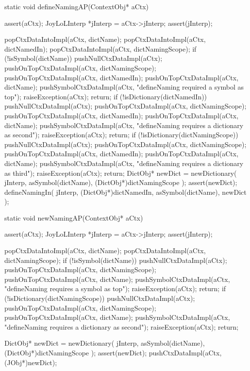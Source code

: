 \startCCode
static void defineNamingAP(ContextObj* aCtx) {
  assert(aCtx);
  JoyLoLInterp *jInterp = aCtx->jInterp;
  assert(jInterp);
  
  popCtxDataIntoImpl(aCtx, dictName);
  popCtxDataIntoImpl(aCtx, dictNamedIn);
  popCtxDataIntoImpl(aCtx, dictNamingScope);
  if (!isSymbol(dictName)) {
    pushNullCtxDataImpl(aCtx);
    pushOnTopCtxDataImpl(aCtx, dictNamingScope);
    pushOnTopCtxDataImpl(aCtx, dictNamedIn);
    pushOnTopCtxDataImpl(aCtx, dictName);
    pushSymbolCtxDataImpl(aCtx,
      "defineNaming required a symbol as top");
    raiseException(aCtx);
    return;
  }
  if (!isDictionary(dictNamedIn)) {
    pushNullCtxDataImpl(aCtx);
    pushOnTopCtxDataImpl(aCtx, dictNamingScope);
    pushOnTopCtxDataImpl(aCtx, dictNamedIn);
    pushOnTopCtxDataImpl(aCtx, dictName);
    pushSymbolCtxDataImpl(aCtx,
      "defineNaming requires a dictionary as second");
    raiseException(aCtx);
    return;
  }
  if (!isDictionary(dictNamingScope)) {
    pushNullCtxDataImpl(aCtx);
    pushOnTopCtxDataImpl(aCtx, dictNamingScope);
    pushOnTopCtxDataImpl(aCtx, dictNamedIn);
    pushOnTopCtxDataImpl(aCtx, dictName);
    pushSymbolCtxDataImpl(aCtx,
      "defineNaming requires a dictionary as third");
    raiseException(aCtx);
    return;
  }
  DictObj* newDict =
    newDictionary(
      jInterp,
      asSymbol(dictName),
      (DictObj*)dictNamingScope
    );
  assert(newDict);
  defineNamingIn(
    jInterp,
    (DictObj*)dictNamedIn,
    asSymbol(dictName),
    newDict
  );
}
\stopCCode

\startCCode
static void newNamingAP(ContextObj* aCtx) {
  assert(aCtx);
  JoyLoLInterp *jInterp = aCtx->jInterp;
  assert(jInterp);

  popCtxDataIntoImpl(aCtx, dictName);
  popCtxDataIntoImpl(aCtx, dictNamingScope);
  if (!isSymbol(dictName)) {
    pushNullCtxDataImpl(aCtx);
    pushOnTopCtxDataImpl(aCtx, dictNamingScope);
    pushOnTopCtxDataImpl(aCtx, dictName);
    pushSymbolCtxDataImpl(aCtx,
      "defineNaming requires a symbol as top");
    raiseException(aCtx);
    return;
  }
  if (!isDictionary(dictNamingScope)) {
    pushNullCtxDataImpl(aCtx);
    pushOnTopCtxDataImpl(aCtx, dictNamingScope);
    pushOnTopCtxDataImpl(aCtx, dictName);
    pushSymbolCtxDataImpl(aCtx,
      "defineNaming requires a dictionary as second");
    raiseException(aCtx);
    return;
  }

  DictObj* newDict =
    newDictionary(
      jInterp,
      asSymbol(dictName),
      (DictObj*)dictNamingScope
    );
  assert(newDict);
  pushCtxDataImpl(aCtx, (JObj*)newDict);
}
\stopCCode

